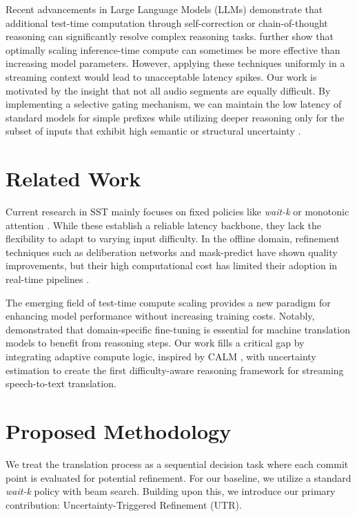 Recent advancements in Large Language Models (LLMs) demonstrate that additional test-time computation through self-correction \citep{madaan2023selfrefine} or chain-of-thought reasoning \citep{wei2022cot} can significantly resolve complex reasoning tasks. \citet{snell2024scaling} further show that optimally scaling inference-time compute can sometimes be more effective than increasing model parameters. However, applying these techniques uniformly in a streaming context would lead to unacceptable latency spikes. Our work is motivated by the insight that not all audio segments are equally difficult. By implementing a selective gating mechanism, we can maintain the low latency of standard models for simple prefixes while utilizing deeper reasoning only for the subset of inputs that exhibit high semantic or structural uncertainty \citep{schuster2022calm}.

\section{Related Work}
Current research in SST mainly focuses on fixed policies like \textit{wait-k} \citep{ma2019stacl} or monotonic attention \citep{ma2020mma}. While these establish a reliable latency backbone, they lack the flexibility to adapt to varying input difficulty. In the offline domain, refinement techniques such as deliberation networks \citep{xia2017deliberation} and mask-predict \citep{ghazvininejad2019maskpredict} have shown quality improvements, but their high computational cost has limited their adoption in real-time pipelines \citep{dou2024iterative}.

The emerging field of test-time compute scaling \citep{snell2024scaling, wang2023selfconsistency} provides a new paradigm for enhancing model performance without increasing training costs. Notably, \citet{li2025tts_mt} demonstrated that domain-specific fine-tuning is essential for machine translation models to benefit from reasoning steps. Our work fills a critical gap by integrating adaptive compute logic, inspired by CALM \citep{schuster2022calm}, with uncertainty estimation \citep{fomicheva2020unsupervised, cheng2024entropy} to create the first difficulty-aware reasoning framework for streaming speech-to-text translation.

\section{Proposed Methodology}
We treat the translation process as a sequential decision task where each commit point is evaluated for potential refinement. For our baseline, we utilize a standard \textit{wait-k} policy with beam search. Building upon this, we introduce our primary contribution: Uncertainty-Triggered Refinement (UTR).

